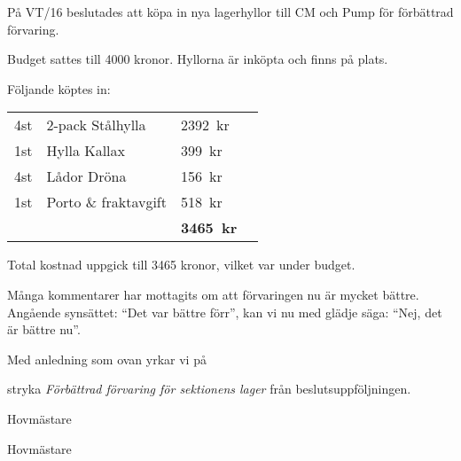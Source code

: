 \documentclass[../_main/handlingar.tex]{subfiles}
\begin{document}

På VT/16 beslutades att köpa in nya lagerhyllor till CM och Pump för förbättrad förvaring.

Budget sattes till 4000 kronor. Hyllorna är inköpta och finns på plats.

Följande köptes in:
\begin{table}[H]
\begin{tabular}{l l l r}
    4st & 2-pack Stålhylla & \SI{2392}{kr}\\
    1st & Hylla Kallax & \SI{399}{kr}\\
    4st & Lådor Dröna & \SI{156}{kr}\\
    1st & Porto \& fraktavgift & \SI{518}{kr}\\
    \hline
    & & \textbf{\SI{3465}{kr}}\\
\end{tabular}
\end{table}

Total kostnad uppgick till 3465 kronor, vilket var under budget.

Många kommentarer har mottagits om att förvaringen nu är mycket bättre. Angående
synsättet: ``Det var bättre förr'', kan vi nu med glädje säga: ``Nej, det är bättre nu''.

Med anledning som ovan yrkar vi på

\begin{attsatser}
    \att stryka \emph{Förbättrad förvaring för sektionens lager} från beslutsuppföljningen.
\end{attsatser}

\begin{signatures}{2}
    \mvh
    \signature{Sanna Nordberg}{Hovmästare}
    \signature{Matilda Dahlström}{Hovmästare}
\end{signatures}
\end{document}
